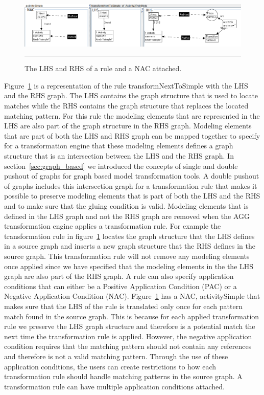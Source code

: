 \begin{figure}[H]
	\centering
	\includegraphics[scale=0.5]{figures/LHSvsRHSAGG.png}
	\rule{35em}{0.5pt}
	\caption[Representation of a rule in AGG]
	{The LHS and RHS of a rule and a NAC attached.}
	\label{fig:LHSvsRHSAGG}
\end{figure}

Figure~\ref{fig:LHSvsRHSAGG} is a representation of the rule
transformNextToSimple with the LHS and the RHS graph. The LHS contains the
graph structure that is used to locate matches while the RHS contains the
graph structure that replaces the located matching pattern. For this rule the
modeling elements that are represented in the LHS are also part of the graph
structure in the RHS graph. Modeling elements that are part of both the LHS and
RHS graph can be mapped together to specify for a transformation engine that
these modeling elements defines a graph structure that is an intersection
between the LHS and the RHS graph. In section~\ref{sec:graph_based} we
introduced the concepts of single and double pushout of graphs for graph based
model transformation tools. A double pushout of graphs includes this
intersection graph for a transformation rule that makes it possible to preserve
modeling elements that is part of both the LHS and the RHS and to make sure
that the gluing condition is valid. Modeling elements that is defined in the LHS
graph and not the RHS graph are removed when the AGG transformation engine
applies a transformation rule. For example the transformation rule in
figure~\ref{fig:LHSvsRHSAGG} locates the graph structure that the LHS defines
in a source graph and inserts a new graph structure that the RHS defines in the
source graph. This transformation rule will not remove any modeling elements
once applied since we have specified that the modeling elements in the
the LHS graph are also part of the RHS graph. A rule can also specify
application conditions that can either be a Positive Application Condition
(PAC) or a Negative Application Condition (NAC).
Figure~\ref{fig:LHSvsRHSAGG} has a NAC, activitySimple that makes sure that the
LHS of the rule is translated only once for each pattern match found in the
source graph. This is because for each applied transformation rule we preserve
the LHS graph structure and therefore is a potential match the next time the
transformation rule is applied. However, the negative application condition
requires that the matching pattern should not contain any references and
therefore is not a valid matching pattern. Through the use of these application
conditions, the users can create restrictions to how each transformation rule
should handle matching patterns in the source graph. A transformation rule
can have multiple application conditions attached.

